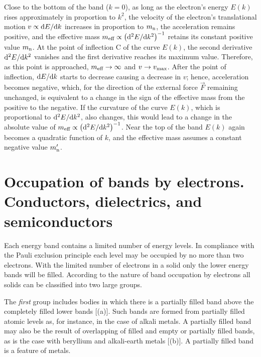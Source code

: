 Close to the bottom of the band ($k=0$), as long as the electron's energy $E(k)$ rises approximately in proportion to $k^2$, the velocity of the electron's translational motion $v\propto\mathrm{d} E/\mathrm{d} k$ increases in proportion to $m_{\text{n}}$, the acceleration remains positive, and the effective mass $m_{\text{eff}}\propto\left(\mathrm{d}^{2}E/\mathrm{d} k^{2}\right)^{-1}$ retains its constant positive value $m_{\text{n}}$.
At the point of inflection C of the curve $E(k)$, the second derivative $\mathrm{d}^{2}E/\mathrm{d} k^{2}$ vanishes and the first derivative reaches its maximum value. Therefore,
as this point is approached, $m_{\text{eff}}\to\infty$ and $v\to v_{\text{max}}$. After the point of inflection, $\mathrm{d} E/\mathrm{d} k$ starts to decrease causing a decrease in $v$; hence, acceleration becomes negative, which, for the direction of the external force $\vec{F}$ remaining unchanged, is equivalent to a change in the sign of the effective mass from the positive to the negative. If the curvature of the curve $E(k)$, which is proportional to $\mathrm{d}^{2}E/\mathrm{d} k^{2}$, also changes, this would lead to a change in the absolute value of $m_{\text{eff}}\propto\left(\mathrm{d}^{2}E/\mathrm{d} k^{2}\right)^{-1}$.
Near the top of the band $E(k)$ again becomes a quadratic function of $k$, and the effective mass assumes a constant negative value $m_{\text{n}}'$.

\section[Occupation of bands by electrons]{Occupation of bands by electrons. Conductors, dielectrics, and semiconductors}\label{sec:42}

Each energy band contains a limited number of energy levels. In compliance with the Pauli exclusion principle each level may be occupied by no more than two electrons. With the limited number of electrons in a solid only the lower energy bands will be filled.
According to the nature of band occupation by electrons all solids can be classified into two large groups.

The \textit{first} group includes bodies in which there is a partially filled band above the completely filled lower bands [(a)]. Such bands are formed from partially filled atomic levels as, for instance, in the case of alkali metals. A partially filled band may also be the result of overlapping of filled and empty or partially filled bands, as is the case with beryllium and alkali-earth metals [(b)]. A partially filled band is a feature of metals.

